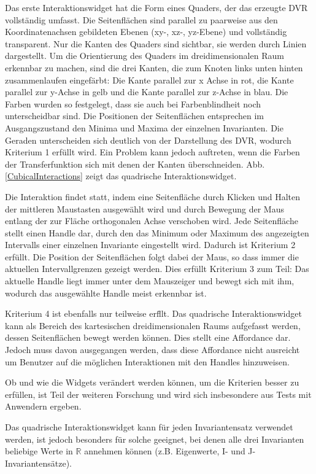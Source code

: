 \documentclass[a4paper,fontsize=12pt,toc=bib,halfparskip]{scrartcl}
\begin{document}
Das erste Interaktionswidget hat die Form eines Quaders, der das erzeugte DVR vollst\"andig umfasst. Die Seitenfl\"achen sind parallel zu paarweise aus den Koordinatenachsen gebildeten Ebenen (xy-, xz-, yz-Ebene) und vollst\"andig transparent. Nur die Kanten des Quaders sind sichtbar, sie werden durch Linien dargestellt. Um die Orientierung des Quaders im dreidimensionalen Raum erkennbar zu machen, sind die drei Kanten, die zum Knoten links unten hinten zusammenlaufen eingef\"arbt: Die Kante parallel zur x Achse in rot, die Kante parallel zur y-Achse in gelb und die Kante parallel zur z-Achse in blau. Die Farben wurden so festgelegt, dass sie auch bei Farbenblindheit noch unterscheidbar sind. Die Positionen der Seitenfl\"achen entsprechen im Ausgangszustand den Minima und Maxima der einzelnen Invarianten. Die Geraden unterscheiden sich deutlich von der Darstellung des DVR, wodurch Kriterium 1 erf\"ullt wird. Ein Problem kann jedoch auftreten, wenn die Farben der Transferfunktion sich mit denen der Kanten \"uberschneiden. Abb. \ref{CubicalInteractions} zeigt das quadrische Interaktionswidget.

Die Interaktion findet statt, indem eine Seitenfl\"ache durch Klicken und Halten der mittleren Maustasten ausgew\"ahlt wird und durch Bewegung der Maus entlang der zur Fl\"ache orthogonalen Achse verschoben wird. Jede Seitenfl\"ache stellt einen Handle dar, durch den das Minimum oder Maximum des angezeigten Intervalls einer einzelnen Invariante eingestellt wird. Dadurch ist Kriterium 2 erf\"ullt. Die Position der Seitenfl\"achen folgt dabei der Maus, so dass immer die aktuellen Intervallgrenzen gezeigt werden. Dies erf\"ullt Kriterium 3 zum Teil: Das aktuelle Handle liegt immer unter dem Mauszeiger und bewegt sich mit ihm, wodurch das ausgew\"ahlte Handle meist erkennbar ist. 

Kriterium 4 ist ebenfalls nur teilweise erf\"llt. Das quadrische Interaktionswidget kann als Bereich des kartesischen dreidimensionalen Raums aufgefasst werden, dessen Seitenfl\"achen bewegt werden k\"onnen. Dies stellt eine Affordance dar. Jedoch muss davon ausgegangen werden, dass diese Affordance nicht ausreicht um Benutzer auf die m\"oglichen Interaktionen mit den Handles hinzuweisen. 

Ob und wie die Widgets ver\"andert werden k\"onnen, um die Kriterien besser zu erf\"ullen, ist Teil der weiteren Forschung und wird sich insbesondere aus Tests mit Anwendern ergeben.

Das quadrische Interaktionswidget kann f\"ur jeden Invariantensatz verwendet werden, ist jedoch besonders f\"ur solche geeignet, bei denen alle drei Invarianten beliebige Werte in $\mathbb{R}$ annehmen k\"onnen (z.B. Eigenwerte, I- und J-Invariantens\"atze).
\end{document}
